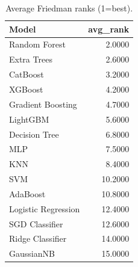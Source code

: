 \begin{table}
\caption{Average Friedman ranks (1=best).}
\label{tab:nemenyi}
\begin{tabular}{lr}
\toprule
Model & avg\_rank \\
\midrule
Random Forest & 2.0000 \\
Extra Trees & 2.6000 \\
CatBoost & 3.2000 \\
XGBoost & 4.2000 \\
Gradient Boosting & 4.7000 \\
LightGBM & 5.6000 \\
Decision Tree & 6.8000 \\
MLP & 7.5000 \\
KNN & 8.4000 \\
SVM & 10.2000 \\
AdaBoost & 10.8000 \\
Logistic Regression & 12.4000 \\
SGD Classifier & 12.6000 \\
Ridge Classifier & 14.0000 \\
GaussianNB & 15.0000 \\
\bottomrule
\end{tabular}
\end{table}

